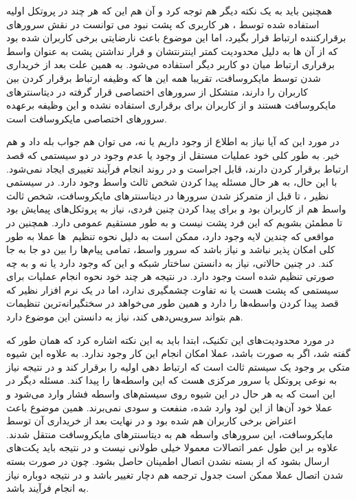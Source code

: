 \documentclass[12pt]{article}
\begin{document}
\begin{enumerate}
همچنین باید به یک نکته دیگر هم توجه کرد و آن هم این که هر چند در پروتکل اولیه استفاده شده توسط ، هر کاربری که پشت  نبود می توانست در نقش سرورهای برقرارکننده ارتباط قرار بگیرد، اما این موضوع باعث نارضایتی برخی کاربران شده بود که از آن ها به دلیل محدودیت کمتر اینترنتشان و قرار نداشتن پشت  به عنوان واسط برقراری ارتباط میان دو کاربر دیگر استفاده می‌شود. به همین علت بعد از خریداری شدن  توسط مایکروسافت، تقریبا همه این  ها که وظیفه ارتباط برقرار کردن بین کاربران را دارند، متشکل از سرورهای اختصاصی قرار گرفته در دیتاسنترهای مایکروسافت هستند و از کاربران برای برقراری  استفاده نشده و این وظیفه برعهده سرورهای اختصاصی مایکروسافت است.


در مورد این که آیا نیاز به اطلاع از وجود  داریم یا نه، می توان هم جواب بله داد و هم خیر. به طور کلی خود عملیات  مستقل از وجود یا عدم وجود  در دو سیستمی که قصد ارتباط برقرار کردن دارند، قابل اجراست و در روند انجام فرآیند تغییری ایجاد نمی‌شود. با این حال، به هر حال مسئله پیدا کردن شخص ثالث واسط وجود دارد. در سیستمی نظیر ، تا قبل از متمرکز شدن سرورها در دیتاسنترهای مایکروسافت، شخص ثالث واسط هم از کاربران بود و برای پیدا کردن چنین فردی، نیاز به پروتکل‌های پیمایش  بود تا مطمئن بشویم که این فرد پشت  نیست و به طور مستقیم  عمومی دارد. همچنین در مواقعی که چندین لایه  وجود دارد، ممکن است به دلیل نحوه تنظیم ‌ ها عملا به طور کلی  امکان پذیر نباشد و نیاز باشد که سرور واسط، تمامی پیام‌ها را بین دو  جا به جا کند. در چنین حالاتی، نیاز به دانستن ساختار شبکه و این که  وجود دارد یا نه و به چه صورتی تنظیم شده است وجود دارد. در نتیجه هر چند خود نحوه انجام عملیات برای سیستمی که پشت  هست یا نه تفاوت چشمگیری ندارد، اما در یک نرم افزار نظیر  که قصد پیدا کردن واسطه‌ها را دارد و همین طور می‌خواهد در سختگیرانه‌ترین تنظیمات  هم بتواند سرویس‌دهی کند، نیاز به دانستن این موضوع دارد.



در مورد محدودیت‌های این تکنیک، ابتدا باید به این نکته اشاره کرد که همان طور که گفته شد، اگر  به صورت  باشد، عملا امکان انجام این کار وجود ندارد. به علاوه این شیوه متکی بر وجود یک سیستم ثالث است که ارتباط دهی اولیه را برقرار کند و در نتیجه نیاز به نوعی پروتکل یا سرور مرکزی هست که این واسطه‌ها را پیدا‌ کند. مسئله دیگر در این است که به هر حال در این شیوه روی سیستم‌های واسطه فشار وارد می‌شود و عملا خود آن‌ها از این لود وارد شده، منفعت و سودی نمی‌برند. همین موضوع باعث اعتراض برخی کاربران  هم شده بود و در نهایت بعد از خریداری آن توسط مایکروسافت، این سرورهای واسطه هم به دیتاسنترهای مایکروسافت منتقل شدند. علاوه بر این طول عمر اتصالات  معمولا خیلی طولانی نیست و در نتیجه باید پکت‌های  ارسال بشود که از بسته نشدن اتصال اطمینان حاصل بشود. چون در صورت بسته شدن اتصال عملا ممکن است جدول ترجمه  هم دچار تغییر باشد و در نتیجه دوباره نیاز به انجام فرآیند  باشد.



\end{enumerate}
\end{document}
